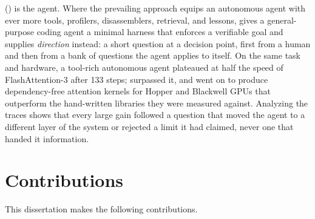\KernelSeek () is the agent.
Where the prevailing approach equips an autonomous agent with ever more tools, profilers, disassemblers, retrieval, and lessons, \KernelSeek gives a general-purpose coding agent a minimal harness that enforces a verifiable goal and supplies \emph{direction} instead: a short question at a decision point, first from a human and then from a bank of questions the agent applies to itself.
On the same task and hardware, a tool-rich autonomous agent plateaued at half the speed of FlashAttention-3 after 133 steps; \KernelSeek surpassed it, and went on to produce dependency-free attention kernels for Hopper and Blackwell GPUs that outperform the hand-written libraries they were measured against.
Analyzing the traces shows that every large gain followed a question that moved the agent to a different layer of the system or rejected a limit it had claimed, never one that handed it information.

\section{Contributions}
\label{intro:sec:contributions}

This dissertation makes the following contributions.

